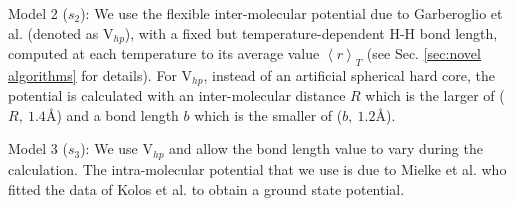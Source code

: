         Model 2 ($s_2$): We use the flexible inter-molecular potential due to Garberoglio et al.\cite{Garberoglio2012} (denoted as V$_{hp}$), with a fixed but temperature-dependent H-H bond length, computed at each temperature to its average value $\left< r \right>_T$ (see Sec. \ref{sec:novel algorithms} for details). For V$_{hp}$, instead of an artificial spherical hard core, the potential is calculated with an inter-molecular distance $R$ which is the larger of ($R,\: 1.4${\AA}) and a bond length $b$ which is the smaller of ($b,\: 1.2${\AA}).

        Model 3 ($s_3$): We use V$_{hp}$ and allow the bond length value to vary during the calculation. The intra-molecular potential that we use is due to Mielke et al.\cite{Mielke2002} who fitted the data of Kolos et al.\cite{Kolos1986} to obtain a ground state potential.

